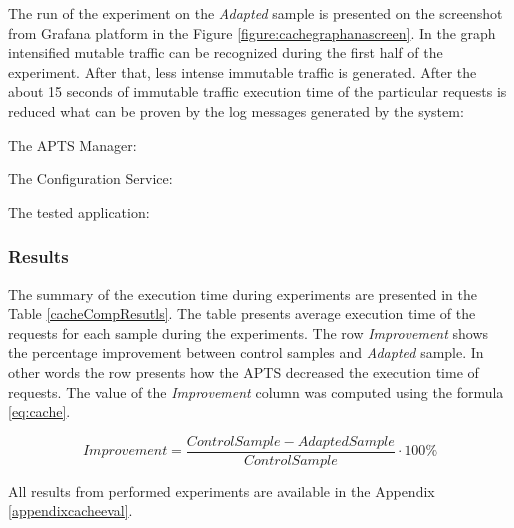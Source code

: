 \documentclass[12pt,a4paper]{article}
\begin{document}
The run of the experiment on the \textit{Adapted} sample is presented on the screenshot from Grafana platform in the Figure \ref{figure:cachegraphanascreen}. In the graph intensified mutable traffic can be recognized during the first half of the experiment. After that, less intense immutable traffic is generated. After the about 15 seconds of immutable traffic execution time of the particular requests is reduced what can be proven by the log messages generated by the system:

The APTS Manager:

\noindent{}\vspace{1mm}

The Configuration Service:

\vspace{1mm}\noindent{}\vspace{1mm}

The tested application:

\vspace{1mm}\noindent{}\vspace{1mm}
 

\subsubsection{Results} 

The summary of the execution time during experiments are presented in the Table \ref{cacheCompResutls}. The table presents average execution time of the requests for each sample during the experiments. The row \textit{Improvement} shows the percentage improvement between control samples and \textit{Adapted} sample. In other words the row presents how the APTS decreased the execution time of requests. The value of the \textit{Improvement} column was computed using the formula \eqref{eq:cache}. 

\begin{equation} \label{eq:cache}
Improvement = \frac{ControlSample - AdaptedSample}{ControlSample} \cdot 100\%
\end{equation}

All results from performed experiments are available in the Appendix \ref{appendixcacheeval}. 
\end{document}
